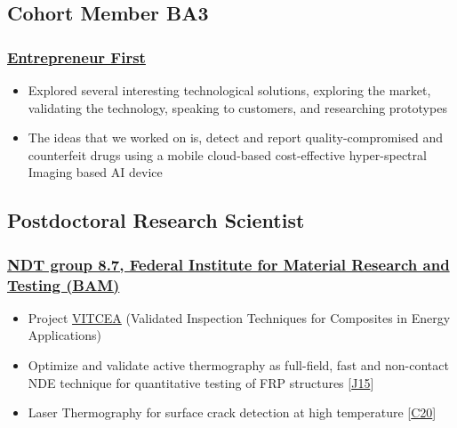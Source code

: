 \documentclass{my_cv}%
\begin{document}
\subsection{Cohort Member BA3}
\subsubsection{\href{https://www.joinef.com/}{Entrepreneur First}}
\begin{itemize}[leftmargin=0.15in]
\setlength\itemsep{-0.1em}
\color{mygray}
\item Explored several interesting technological solutions, exploring the market, validating the technology, speaking to customers, and researching prototypes
\item The ideas that we worked on is, detect and report quality-compromised and counterfeit drugs using a mobile cloud-based cost-effective hyper-spectral Imaging based AI device
\end{itemize}
{\color{mygray1} \hdashrule[0.1ex]{18.8cm}{0.2mm}{1mm}}
\subsection{Postdoctoral Research Scientist}
\subsubsection{\href{https://www.bam.de/Navigation/DE/Home/home.html}{NDT group 8.7, Federal Institute for Material Research and Testing (BAM)}}
\begin{itemize}[leftmargin=0.15in]
\setlength\itemsep{-0.1em}
\color{mygray}
\item Project \href{http://projects.npl.co.uk/vitcea/}{VITCEA} (Validated Inspection Techniques for Composites in Energy Applications) 
\item Optimize and validate active thermography as full-field, fast and non-contact NDE technique for quantitative testing of FRP structures [\textcolor{mypink}{\hyperref[J15]{J15}}]
\item Laser Thermography for surface crack detection at high temperature [\textcolor{mypink}{\hyperref[C20]{C20}}]
\end{itemize}
{\color{mygray1} \hdashrule[0.1ex]{18.8cm}{0.2mm}{1mm}}
\end{document}
